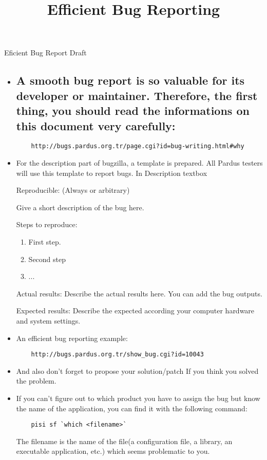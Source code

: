 \documentclass[a4paper,10pt]{article}
\title{Efficient Bug Reporting}
\begin{document}
\maketitle

Eficient Bug Report Draft

\begin{itemize}
 
  	\item \subsection*{A smooth bug report is so valuable for its developer or maintainer. Therefore, the first thing, you should read the informations on this document very carefully:}
	\begin{verbatim} 
 	http://bugs.pardus.org.tr/page.cgi?id=bug-writing.html#why
	\end{verbatim}

  	\item For the description part of bugzilla, a template is prepared. All Pardus testers will use this template to report bugs.
  	In Description textbox

   	Reproducible: (Always or arbitrary)	
   
    	Give a short description of the bug here.
   
   	Steps to reproduce:
   	\begin{enumerate}
    	\item First step.
    	\item Second step
    	\item ...
   	\end{enumerate}

	Actual results:
	Describe the actual results here. You can add the bug outputs.
	
	Expected results:
	Describe the expected according your computer hardware and system settings.
	
	\item An efficient bug reporting example:
	\begin{verbatim}
	http://bugs.pardus.org.tr/show_bug.cgi?id=10043
	\end{verbatim}
	\item And also don't forget to propose your solution/patch If you think you solved the problem.

  	\item If you can't figure out to which product you have to assign the bug but know the name of the application, you can find it with the following command:
	\begin{verbatim}
	pisi sf `which <filename>`
	\end{verbatim}
	The filename is the name of the file(a configuration file, a library, an executable application, etc.) which seems problematic to you.


\end{itemize}
\end{document}
